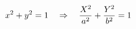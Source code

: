 \documentclass[preview]{standalone}
\begin{document}
\begin{align*}
\special{dvisvgm:raw <g id='unique000'>}x^2+y^2=1\quad\Rightarrow\quad \frac{X^2}{a^2}+\frac{Y^2}{b^2}=1\special{dvisvgm:raw </g>}
\end{align*}
\end{document}
